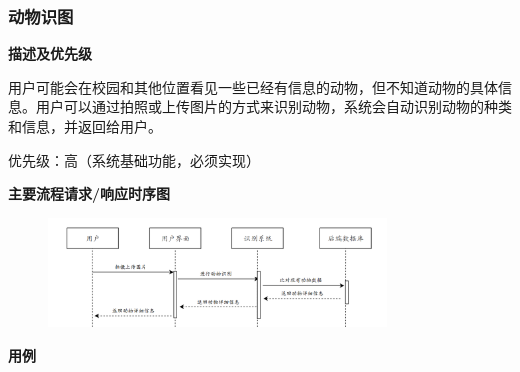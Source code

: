\documentclass[12pt,a4paper,UTF8]{article}
\begin{document}
\subsubsection{动物识图}

\noindent\textbf{描述及优先级}

用户可能会在校园和其他位置看见一些已经有信息的动物，但不知道动物的具体信息。用户可以通过拍照或上传图片的方式来识别动物，系统会自动识别动物的种类和信息，并返回给用户。

优先级：高（系统基础功能，必须实现）

\noindent\textbf{主要流程请求/响应时序图}

\begin{figure}[H]
  \centering
  \includegraphics[width=0.8\textwidth]{figures/use328.png}
\end{figure}  

\noindent\textbf{用例}
\end{document}
